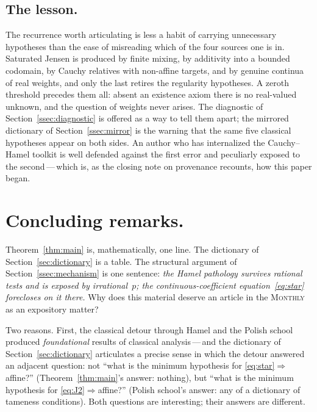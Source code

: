 \documentclass{article}
\theoremstyle{plain}
\theoremstyle{definition}
\begin{document}
\subsection{The lesson.}
\label{ssec:lesson}

The recurrence worth articulating is less a habit of carrying unnecessary hypotheses than the ease of misreading which of the
four sources one is in. Saturated Jensen is produced by finite
mixing, by additivity into a bounded codomain, by Cauchy relatives
with non-affine targets, and by genuine continua of real weights,
and only the last retires the regularity hypotheses. A zeroth threshold
precedes them all: absent an existence axiom there is no real-valued
unknown, and the question of weights never arises. The diagnostic
of Section~\ref{ssec:diagnostic} is offered as a way to tell
them apart; the mirrored dictionary of Section~\ref{ssec:mirror} is
the warning that the same five classical hypotheses appear on both
sides. An author who has internalized the Cauchy--Hamel toolkit is
well defended against the first error and peculiarly exposed to the
second\,---\,which is, as the closing note on provenance recounts,
how this paper began.

\section{Concluding remarks.}
\label{sec:conclusion}

Theorem~\ref{thm:main} is, mathematically, one line. The dictionary of
Section~\ref{sec:dictionary} is a table. The structural
argument of Section~\ref{ssec:mechanism} is one sentence: \emph{the
Hamel pathology survives rational tests and is exposed by irrational~$p$; the continuous-coefficient
equation~\eqref{eq:star} forecloses on it there.} Why does this material
deserve an article in the \textsc{Monthly} as an expository matter?

Two reasons. First, the classical detour through Hamel and the Polish
school produced \emph{foundational} results of classical
analysis\,---\,and the dictionary of Section~\ref{sec:dictionary}
articulates a precise sense in which the detour answered an adjacent
question: not ``what is the minimum hypothesis for
\eqref{eq:star}$\Rightarrow$affine?'' (Theorem~\ref{thm:main}'s
answer: nothing), but ``what is the minimum hypothesis for
\eqref{eq:J2}$\Rightarrow$affine?'' (Polish school's answer: any of a
dictionary of tameness conditions). Both questions are interesting;
their answers are different.
\end{document}
